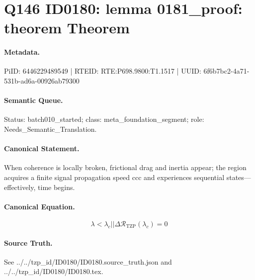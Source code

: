 \section*{Q146 ID0180: lemma 0181\_proof: theorem Theorem}
\paragraph{Metadata.}
PiID: 6446229489549 | RTEID: RTE:P698.9800:T1.1517 | UUID: 6f6b7bc2-4a71-531b-ad6a-00926ab79300

\paragraph{Semantic Queue.}
Status: batch010\_started; class: meta\_foundation\_segment; role: Needs\_Semantic\_Translation.

\paragraph{Canonical Statement.}
When coherence is locally broken, frictional drag and inertia appear; the region acquires a finite signal propagation speed ccc and experiences sequential states---effectively, time begins.

\paragraph{Canonical Equation.}
\[
\lambda < \lambda_c || \Delta \mathcal{R}_{\mathrm{TZP}}(\lambda_c)=0
\]

\paragraph{Source Truth.}
See ../../tzp\_id/ID0180/ID0180.source\_truth.json and ../../tzp\_id/ID0180/ID0180.tex.
